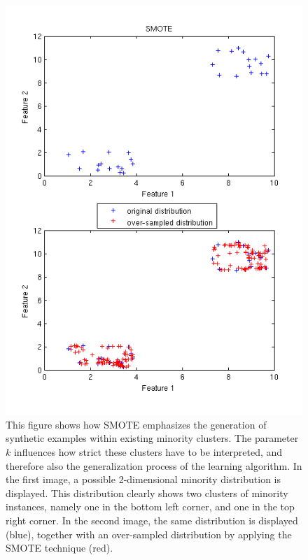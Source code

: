 \begin{figure}[h]
\includegraphics[scale=0.65]{img/SMOTE_featureSampling.png}
\caption{This figure shows how SMOTE emphasizes the generation of synthetic examples within existing minority clusters. The parameter $k$ influences how strict these clusters have to be interpreted, and therefore also the generalization process of the learning algorithm. In the first image, a possible 2-dimensional minority distribution is displayed. This distribution clearly shows two clusters of minority instances, namely one in the bottom left corner, and one in the top right corner. In the second image, the same distribution is displayed (blue), together with an over-sampled distribution by applying the SMOTE technique (red).}
\label{fig:SMOTE}
\end{figure}

